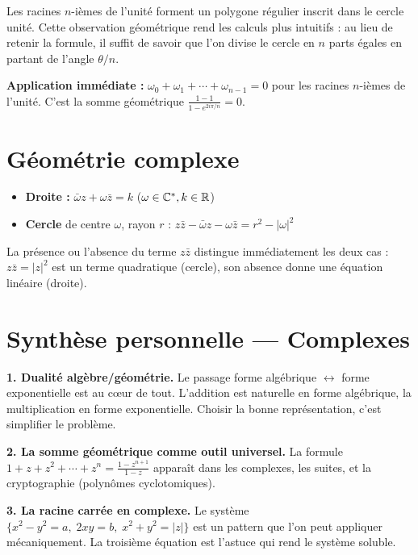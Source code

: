 \begin{intuitionbox}
Les racines $n$-ièmes de l'unité forment un polygone régulier inscrit dans le cercle unité. Cette observation géométrique rend les calculs plus intuitifs : au lieu de retenir la formule, il suffit de savoir que l'on divise le cercle en $n$ parts égales en partant de l'angle $\theta/n$.

\textbf{Application immédiate :} $\omega_0 + \omega_1 + \cdots + \omega_{n-1} = 0$ pour les racines $n$-ièmes de l'unité. C'est la somme géométrique $\frac{1 - 1}{1 - e^{2i\pi/n}} = 0$.
\end{intuitionbox}


\section{Géométrie complexe}

\begin{propbox}
\begin{itemize}[leftmargin=1cm]
  \item \textbf{Droite :} $\bar{\omega}z + \omega\bar{z} = k$ \quad ($\omega \in \mathbb{C}^*, k \in \mathbb{R}$)
  \item \textbf{Cercle} de centre $\omega$, rayon $r$ : $z\bar{z} - \bar{\omega}z - \omega\bar{z} = r^2 - |\omega|^2$
\end{itemize}
\end{propbox}

\begin{intuitionbox}
La présence ou l'absence du terme $z\bar{z}$ distingue immédiatement les deux cas : $z\bar{z} = |z|^2$ est un terme quadratique (cercle), son absence donne une équation linéaire (droite).
\end{intuitionbox}


\section{Synthèse personnelle --- Complexes}

\begin{intuitionbox}
\textbf{1. Dualité algèbre/géométrie.} Le passage forme algébrique $\leftrightarrow$ forme exponentielle est au c\oe ur de tout. L'addition est naturelle en forme algébrique, la multiplication en forme exponentielle. Choisir la bonne représentation, c'est simplifier le problème.

\textbf{2. La somme géométrique comme outil universel.} La formule $1 + z + z^2 + \cdots + z^n = \frac{1 - z^{n+1}}{1 - z}$ apparaît dans les complexes, les suites, et la cryptographie (polynômes cyclotomiques).

\textbf{3. La racine carrée en complexe.} Le système $\{x^2 - y^2 = a,\; 2xy = b,\; x^2 + y^2 = |z|\}$ est un pattern que l'on peut appliquer mécaniquement. La troisième équation est l'astuce qui rend le système soluble.
\end{intuitionbox}


